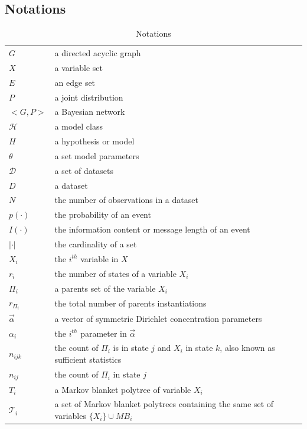 \newpage
\subsection{Notations}
\begin{table}[]
\centering
\caption{Notations}
\label{my-label}
\begin{tabular}{ll}
\hline
$G$ &  a directed acyclic graph\\
$X$ & a variable set \\ 
$E$ & an edge set \\
$P$ & a joint distribution \\
$<G, P>$ & a Bayesian network \\
$\mathcal{H}$ & a model class \\
$H$ & a hypothesis or model \\
$\theta$ &  a set model parameters\\
$\mathcal{D}$ & a set of datasets \\
$D$ & a dataset \\ 
$N$ & the number of observations in a dataset \\
$p(\cdot)$ & the probability of an event \\
$I(\cdot)$ & the information content or message length of an event\\
$|\cdot|$ & the cardinality of a set \\
$X_i$ & the $i^{th}$ variable in $X$ \\ 
$r_i$ & the number of states of a variable $X_i$ \\ 
$\Pi_i$ & a parents set of the variable $X_i$ \\ 
$r_{\Pi_i}$ & the total number of parents instantiations\\
$\vec{\alpha}$ & a vector of symmetric Dirichlet concentration parameters \\ 
$\alpha_i$ & the $i^{th}$ parameter in $\vec{\alpha}$ \\ 
$n_{ijk}$ & the count of $\Pi_i$ is in state $j$ and $X_i$ in state $k$, also known as sufficient statistics\\ 
$n_{ij}$ & the count of $\Pi_i$ in state $j$ \\ 
$T_i$ & a Markov blanket polytree of variable $X_i$ \\
$\mathcal{T}_i$ & a set of Markov blanket polytrees containing the same set of variables $\{X_i\}\cup MB_i$ \\ \hline
\end{tabular}
\end{table}


\newpage





